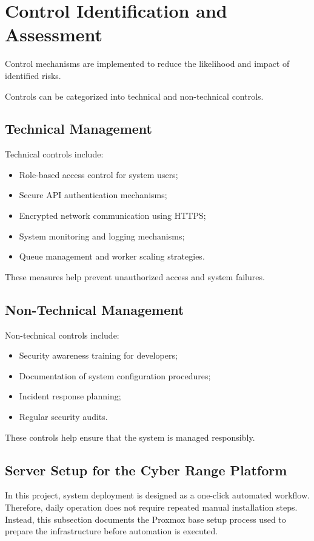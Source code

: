 \section{Control Identification and Assessment}
Control mechanisms are implemented to reduce the likelihood and impact of identified risks.

Controls can be categorized into technical and non-technical controls.

\subsection{Technical Management}
Technical controls include:
\begin{itemize}
    \item Role-based access control for system users;
    \item Secure API authentication mechanisms;
    \item Encrypted network communication using HTTPS;
    \item System monitoring and logging mechanisms;
    \item Queue management and worker scaling strategies.
\end{itemize}
These measures help prevent unauthorized access and system failures.

\subsection{Non-Technical Management}
Non-technical controls include:
\begin{itemize}
    \item Security awareness training for developers;
    \item Documentation of system configuration procedures;
    \item Incident response planning;
    \item Regular security audits.
\end{itemize}
These controls help ensure that the system is managed responsibly.

\subsection{Server Setup for the Cyber Range Platform}
In this project, system deployment is designed as a one-click automated workflow. Therefore, daily operation does not require repeated manual installation steps. Instead, this subsection documents the Proxmox base setup process used to prepare the infrastructure before automation is executed.

